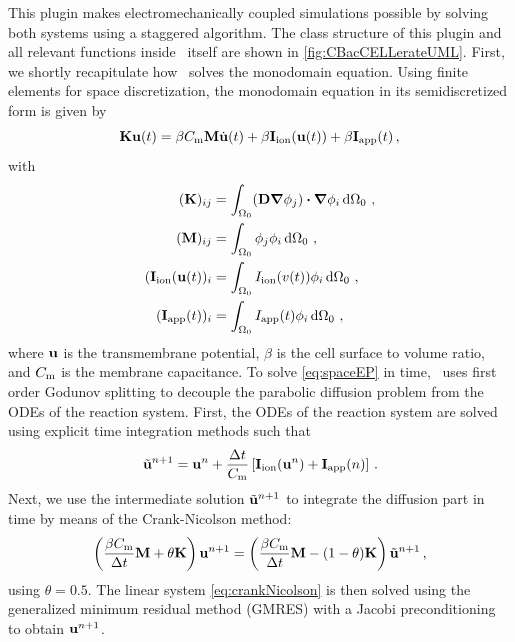 This plugin makes electromechanically coupled simulations possible by solving both systems using a staggered algorithm.
The class structure of this plugin and all relevant functions inside \ACC~itself are shown in \autoref{fig:CBacCELLerateUML}.
First, we shortly recapitulate how \ACC~solves the monodomain equation.
Using finite elements for space discretization, the monodomain equation in its semidiscretized form is given by
\begin{equation}
    \vec K \u(t) = \beta \Cm \vec M \dot{\u}(t) + \beta \vec I_\mathrm{ion}(\u(t)) + \beta \vec I_\mathrm{app}(t) \label{eq:spaceEP} \,,
\end{equation}
with
\begin{align*}
    (\vec K)_{ij} &= \int_{\Omega_0} ( \D \grad{\phi_j}) \dotproduct \grad{\phi_i} \dd{\Omega_0} \,, \\
    (\vec M)_{ij} &= \int_{\Omega_0} \phi_j \phi_i \dd{\Omega_0} \,, \\
    (\vec I_\mathrm{ion}(\u(t))_i &= \int_{\Omega_0} \Iion(v(t)) \phi_i \dd{\Omega_0} \,, \\
    (\vec I_\mathrm{app}(t))_i &= \int_{\Omega_0} \Iext(t) \phi_i \dd{\Omega_0} \,,
\end{align*}
where $\u$ is the transmembrane potential, $\beta$ is the cell surface to volume ratio, and $C_\mathrm{m}$ is the membrane capacitance.
To solve \autoref{eq:spaceEP} in time, \ACC~uses first order Godunov splitting to decouple the parabolic diffusion problem from the ODEs of the reaction system.
First, the ODEs of the reaction system are solved using explicit time integration methods such that
\begin{equation}
    \unp{n+1} = \un{n} + \frac{\dt}{\Cm}\left[ \vec I_\mathrm{ion}(\un{n}) + \vec I_\mathrm{app}(n) \right] \,. \label{eq:voltage}
\end{equation}
Next, we use the intermediate solution $\unp{n+1}$ to integrate the diffusion part in time by means of the Crank-Nicolson method:
\begin{equation}
    \left( \frac{\beta \Cm}{\dt} \M + \theta \K \right) \un{n+1} = \left( \frac{\beta \Cm}{\dt} \M - (1 - \theta) \K \right) \unp{n+1} \label{eq:crankNicolson} \,,
\end{equation}
using $\theta = 0.5$.
The linear system \eqref{eq:crankNicolson} is then solved using the generalized minimum residual method (GMRES) with a Jacobi preconditioning to obtain $\un{n+1}$.


